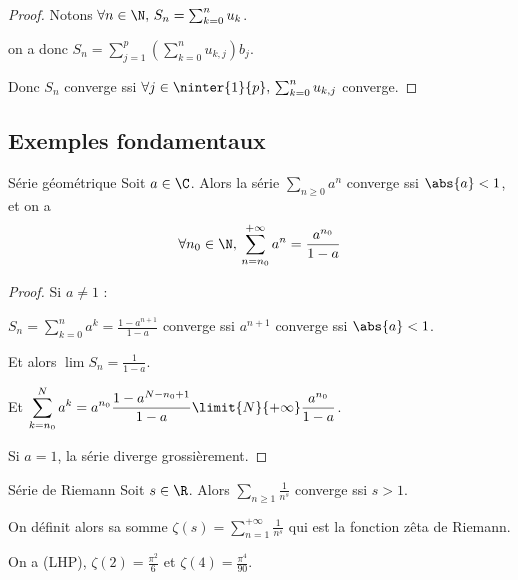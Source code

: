 \begin{proof}
    Notons $\forall n \in \N, \, S_n = \sum_{k=0}^n u_k$. 

    on a donc $\displaystyle S_n = \sum_{j=1}^p \left( \sum_{k = 0}^{n} u_{k, j} \right) b_j$. 

    Donc $S_n$ converge ssi $\forall j \in \ninter{1}{p}, \, \sum_{k=0}^n u_{k, j}$ converge.
\end{proof}

\subsection{Exemples fondamentaux}

\begin{theoreme}{Série géométrique}{}
    Soit $a \in \C$. Alors la série $\sum_{n \geqslant 0} a^n$ converge ssi $\abs{a} < 1$, 
    et on a $$\forall n_0 \in \N, \, \sum_{n = n_0}^{+ \infty} a^n = \frac{a^{n_0}}{1 - a}$$
\end{theoreme}


\begin{proof}
    Si $a \neq 1$ : 

    $\displaystyle S_n = \sum_{k = 0}^{n } a^k = \frac{1 - a^{n+1}}{1 - a}$ converge ssi 
    $a^{n+1} $ converge ssi $\abs{a} < 1$.

    Et alors $\lim S_n = \frac{1}{1 - a}$.

    Et $\displaystyle \sum_{k = n_0 }^{N} a^k = a^{n_0} \frac{1 - a^{N - n_0 + 1}}{1 - a} \limit{N}{+ \infty} \frac{a^{n_0}}{1 - a}$.

    Si $a = 1$, la série diverge grossièrement.
\end{proof}

\begin{theoreme}{Série de Riemann}{}
    Soit $s \in \R$. Alors $\displaystyle \sum_{n \geqslant 1} \frac{1}{n^s}$ converge ssi $s > 1$.

    On définit alors sa somme $\displaystyle \zeta(s) = \sum_{n = 1}^{+\infty} \frac{1}{n^s}$ qui est la fonction zêta de Riemann.
    
    On a (LHP), $\zeta(2) = \frac{\pi^2}{6}$ et $\zeta(4) = \frac{\pi^4}{90}$.
\end{theoreme}


